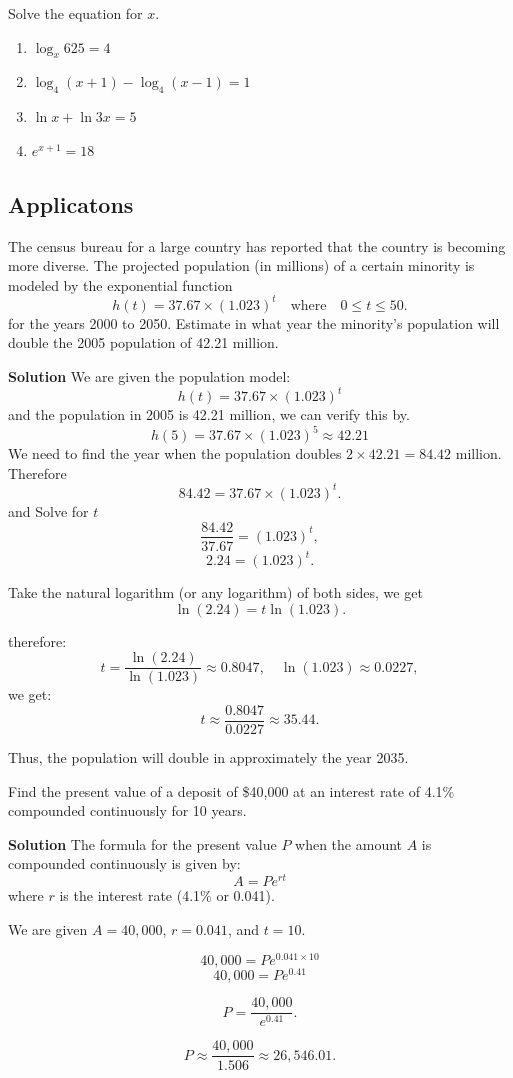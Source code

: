 \begin{example}
  Solve the equation for $x$.
  \begin{enumerate}
  \item $\log_{x} 625 = 4$ 
  \item $\log_{4} (x+1) - \log_{4}(x-1)  = 1$ 
  \item $\ln x + \ln 3x = 5 $
  \item $e^{x+1} = 18$ 
  \end{enumerate}
\end{example}

\subsection{Applicatons}

\begin{example}
The census bureau for a large country has reported that the country is becoming more diverse. The projected population (in millions) of a certain minority is modeled by the exponential function
\[
h(t) = 37.67 \times (1.023)^t \quad \text{where} \quad 0 \leq t \leq 50.
\]
for the years 2000 to 2050.
Estimate in what year the minority's population will double the 2005 population of 42.21 million. 

\end{example}

\textbf{Solution}
We are given the population model:
\[
h(t) = 37.67 \times (1.023)^t
\]
and the population in 2005 is 42.21 million, we can verify this by.
\[
h(5) = 37.67 \times (1.023)^{5} \approx 42.21
\]
We need to find the year when the population doubles 
\(
2 \times 42.21 = 84.42 \text{ million}.
\)
Therefore
\[
84.42 = 37.67 \times (1.023)^t.
\]
and  Solve for \( t \)
\[
\frac{84.42}{37.67} = (1.023)^t,
\]
\[
2.24 = (1.023)^t.
\]

Take the natural logarithm (or any logarithm) of both sides, we get
\[
\ln(2.24) = t \ln(1.023).
\]

therefore:
\[
t = \frac{\ln(2.24)}{\ln(1.023)} \approx 
 0.8047, \quad \ln(1.023) \approx 0.0227,
\]
we get:
\[
t \approx \frac{0.8047}{0.0227} \approx 35.44.
\]

Thus, the population will double in approximately the year 2035.

\begin{example}
Find the present value of a deposit of \$40,000 at an interest rate of 4.1\% compounded continuously for 10 years.
\end{example}

\textbf{Solution}
The formula for the present value \( P \) when the amount \( A \) is compounded continuously is given by:
\[
A = P e^{rt}
\]
where \( r \) is the interest rate (4.1\% or 0.041).

We are given \( A = 40,000 \), \( r = 0.041 \), and  \( t = 10 \). 

\[
40,000 = P e^{0.041 \times 10}
\]
\[
40,000 = P e^{0.41}
\]

\[
P = \frac{40,000}{e^{0.41}}.
\]

\[
P \approx \frac{40,000}{1.506} \approx 26,546.01.
\]
